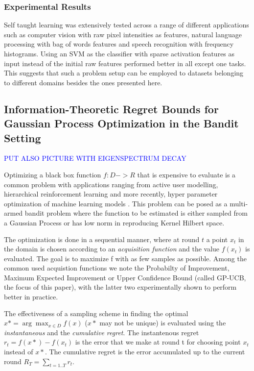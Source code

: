 \documentclass[10pt,journal,a4paper]{IEEEtran}
\begin{document}
\subsubsection{Experimental Results}
Self taught learning was extensively tested across a range of different applications such as computer vision with raw pixel intensities as features, natural language processing with bag of words features and speech recognition with frequency histograms. Using an SVM as the classifier with sparse activation features as input instead of the initial raw features performed better in all except one tasks. This suggests that such a problem setup can be employed to datasets belonging to different domains besides the ones presented here.

\subsection{Information-Theoretic Regret Bounds for Gaussian Process Optimization in the Bandit Setting}
\textcolor{blue}{ PUT ALSO PICTURE WITH EIGENSPECTRUM DECAY
}

Optimizing a black box function $f: D->R$ that is expensive to evaluate is a common problem with applications ranging from active user modelling, hierarchical reinforcement learning\cite{BPtutorial} and more recently, hyper parameter optimization of machine learning models \cite{hyperparameter}. This problem can be posed as a multi-armed bandit problem where the function to be estimated is either sampled from a Gaussian Process or has low norm in reproducing Kernel Hilbert space.

The optimization is done in a sequential manner, where at round $t$ a point $x_t$ in the domain is chosen according to an \textit{acquisition function} and the value $f(x_t)$ is evaluated. The goal is to maximize f with as few samples as possible. Among the common used acquistion functions we note the Probabilty of Improvement, Maximum Expected Improvement or Upper Confidence Bound (called GP-UCB, the focus of this paper), with the latter two experimentally shown to perform better in practice. 

The effectiveness of a sampling scheme in finding the optimal $x* = \arg\max_{x\in D}f(x)$ ($x*$  may not be unique) is evaluated using the \textit{instantaneous} and the 
\textit{cumulative regret}.  The instantenous regret $r_t = f(x*) - f(x_t)$ is the error that we make at round t for choosing point $x_t$ instead of $x*$. The cumulative regret is the error accumulated up to the current round $R_T = \sum_{t=1..T} r_t$.
\end{document}
